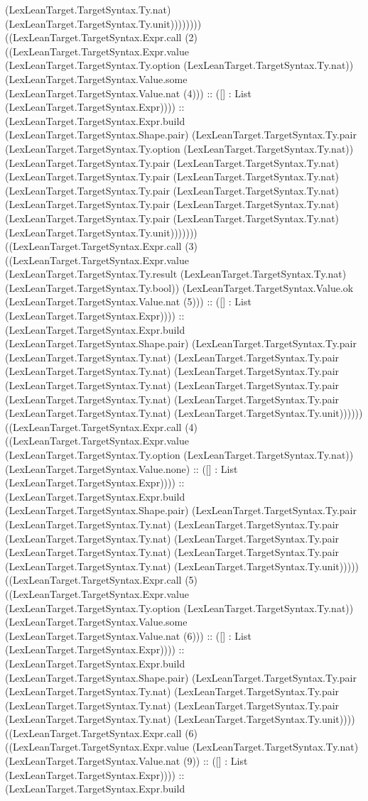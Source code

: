 \documentclass[11pt]{article}
\begin{document}
(LexLeanTarget.TargetSyntax.Ty.nat) (LexLeanTarget.TargetSyntax.Ty.unit)))))))) ((LexLeanTarget.TargetSyntax.Expr.call (2) ((LexLeanTarget.TargetSyntax.Expr.value (LexLeanTarget.TargetSyntax.Ty.option (LexLeanTarget.TargetSyntax.Ty.nat)) (LexLeanTarget.TargetSyntax.Value.some (LexLeanTarget.TargetSyntax.Value.nat (4))) :: ([] : List (LexLeanTarget.TargetSyntax.Expr)))) :: (LexLeanTarget.TargetSyntax.Expr.build (LexLeanTarget.TargetSyntax.Shape.pair) (LexLeanTarget.TargetSyntax.Ty.pair (LexLeanTarget.TargetSyntax.Ty.option (LexLeanTarget.TargetSyntax.Ty.nat)) (LexLeanTarget.TargetSyntax.Ty.pair (LexLeanTarget.TargetSyntax.Ty.nat) (LexLeanTarget.TargetSyntax.Ty.pair (LexLeanTarget.TargetSyntax.Ty.nat) (LexLeanTarget.TargetSyntax.Ty.pair (LexLeanTarget.TargetSyntax.Ty.nat) (LexLeanTarget.TargetSyntax.Ty.pair (LexLeanTarget.TargetSyntax.Ty.nat) (LexLeanTarget.TargetSyntax.Ty.pair (LexLeanTarget.TargetSyntax.Ty.nat) (LexLeanTarget.TargetSyntax.Ty.unit))))))) ((LexLeanTarget.TargetSyntax.Expr.call (3) ((LexLeanTarget.TargetSyntax.Expr.value (LexLeanTarget.TargetSyntax.Ty.result (LexLeanTarget.TargetSyntax.Ty.nat) (LexLeanTarget.TargetSyntax.Ty.bool)) (LexLeanTarget.TargetSyntax.Value.ok (LexLeanTarget.TargetSyntax.Value.nat (5))) :: ([] : List (LexLeanTarget.TargetSyntax.Expr)))) :: (LexLeanTarget.TargetSyntax.Expr.build (LexLeanTarget.TargetSyntax.Shape.pair) (LexLeanTarget.TargetSyntax.Ty.pair (LexLeanTarget.TargetSyntax.Ty.nat) (LexLeanTarget.TargetSyntax.Ty.pair (LexLeanTarget.TargetSyntax.Ty.nat) (LexLeanTarget.TargetSyntax.Ty.pair (LexLeanTarget.TargetSyntax.Ty.nat) (LexLeanTarget.TargetSyntax.Ty.pair (LexLeanTarget.TargetSyntax.Ty.nat) (LexLeanTarget.TargetSyntax.Ty.pair (LexLeanTarget.TargetSyntax.Ty.nat) (LexLeanTarget.TargetSyntax.Ty.unit)))))) ((LexLeanTarget.TargetSyntax.Expr.call (4) ((LexLeanTarget.TargetSyntax.Expr.value (LexLeanTarget.TargetSyntax.Ty.option (LexLeanTarget.TargetSyntax.Ty.nat)) (LexLeanTarget.TargetSyntax.Value.none) :: ([] : List (LexLeanTarget.TargetSyntax.Expr)))) :: (LexLeanTarget.TargetSyntax.Expr.build (LexLeanTarget.TargetSyntax.Shape.pair) (LexLeanTarget.TargetSyntax.Ty.pair (LexLeanTarget.TargetSyntax.Ty.nat) (LexLeanTarget.TargetSyntax.Ty.pair (LexLeanTarget.TargetSyntax.Ty.nat) (LexLeanTarget.TargetSyntax.Ty.pair (LexLeanTarget.TargetSyntax.Ty.nat) (LexLeanTarget.TargetSyntax.Ty.pair (LexLeanTarget.TargetSyntax.Ty.nat) (LexLeanTarget.TargetSyntax.Ty.unit))))) ((LexLeanTarget.TargetSyntax.Expr.call (5) ((LexLeanTarget.TargetSyntax.Expr.value (LexLeanTarget.TargetSyntax.Ty.option (LexLeanTarget.TargetSyntax.Ty.nat)) (LexLeanTarget.TargetSyntax.Value.some (LexLeanTarget.TargetSyntax.Value.nat (6))) :: ([] : List (LexLeanTarget.TargetSyntax.Expr)))) :: (LexLeanTarget.TargetSyntax.Expr.build (LexLeanTarget.TargetSyntax.Shape.pair) (LexLeanTarget.TargetSyntax.Ty.pair (LexLeanTarget.TargetSyntax.Ty.nat) (LexLeanTarget.TargetSyntax.Ty.pair (LexLeanTarget.TargetSyntax.Ty.nat) (LexLeanTarget.TargetSyntax.Ty.pair (LexLeanTarget.TargetSyntax.Ty.nat) (LexLeanTarget.TargetSyntax.Ty.unit)))) ((LexLeanTarget.TargetSyntax.Expr.call (6) ((LexLeanTarget.TargetSyntax.Expr.value (LexLeanTarget.TargetSyntax.Ty.nat) (LexLeanTarget.TargetSyntax.Value.nat (9)) :: ([] : List (LexLeanTarget.TargetSyntax.Expr)))) :: (LexLeanTarget.TargetSyntax.Expr.build 
\end{document}

